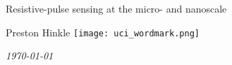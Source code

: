 



{
\begin{frame}[c]
 \begin{center}
  

  
  \Huge{
	\textcolor{gray0}{Resistive-pulse sensing at the micro- and nanoscale}
  }
  
  
  \vspace{.25in}
  {\Large 
	\textcolor{gray1}{Preston Hinkle} \hspace{.5in} \texttt{[image: uci\_wordmark.png]}
  }
  
  
  \vspace{.5in}
  {\small
	\textit{\today}
  }
  
  
  
 \end{center}

\end{frame}
}





